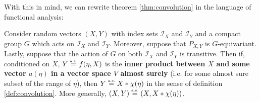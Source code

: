 With this in mind, we can rewrite theorem \ref{thm:convolution} in the language of functional analysis:

\begin{theorem}
	Consider random vectors $(X,Y)$ with index sets $\mathcal{I}_X$ and $\mathcal{I}_Y$ and a compact group $G$ which acts on $\mathcal{I}_X$ and $\mathcal{I}_Y$.
	Moreover, suppose that $P_{X,Y}$ is $G$-equivariant.
	Lastly, suppose that the action of $G$ on both $\mathcal{I}_X$ and $\mathcal{I}_Y$ is transitive.
	Then if, conditioned on $X$, $Y \stackrel{\text{\rm\tiny a.s.}}{=} f(\eta, X)$ is the \textbf{inner product between $X$ and some vector $a(\eta)$ in a vector space $V$ almost surely} (i.e. for some almost sure subset of the range of $\eta$), then $Y \stackrel{\text{\rm\tiny a.s.}}{=} X * \chi(\eta)$ in the sense of definition \ref{def:convolution}.
	More generally, $(X,Y) \stackrel{\text{\rm\tiny a.s.}}{=} (X,X * \chi(\eta))$.
\end{theorem}